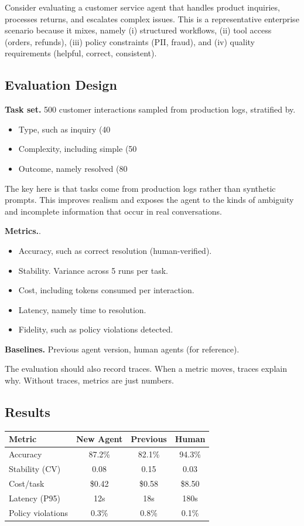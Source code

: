 Consider evaluating a customer service agent that handles product inquiries, processes returns, and escalates complex issues. This is a representative enterprise scenario because it mixes, namely (i) structured workflows, (ii) tool access (orders, refunds), (iii) policy constraints (PII, fraud), and (iv) quality requirements (helpful, correct, consistent).

\subsection{Evaluation Design}

\textbf{Task set.} 500 customer interactions sampled from production logs, stratified by.
\begin{itemize}
\item Type, such as inquiry (40%
\item Complexity, including simple (50%
\item Outcome, namely resolved (80%
\end{itemize}

The key here is that tasks come from production logs rather than synthetic prompts. This improves realism and exposes the agent to the kinds of ambiguity and incomplete information that occur in real conversations.

\textbf{Metrics.}.
\begin{itemize}
\item Accuracy, such as correct resolution (human-verified).
\item Stability. Variance across 5 runs per task.
\item Cost, including tokens consumed per interaction.
\item Latency, namely time to resolution.
\item Fidelity, such as policy violations detected.
\end{itemize}

\textbf{Baselines.} Previous agent version, human agents (for reference).

The evaluation should also record traces. When a metric moves, traces explain why. Without traces, metrics are just numbers.

\subsection{Results}

\begin{center}
\begin{tabular}{lccc}
\toprule
Metric & New Agent & Previous & Human \\
\midrule
Accuracy & 87.2\% & 82.1\% & 94.3\% \\
Stability (CV) & 0.08 & 0.15 & 0.03 \\
Cost/task & \$0.42 & \$0.58 & \$8.50 \\
Latency (P95) & 12s & 18s & 180s \\
Policy violations & 0.3\% & 0.8\% & 0.1\% \\
\bottomrule
\end{tabular}
\end{center}

